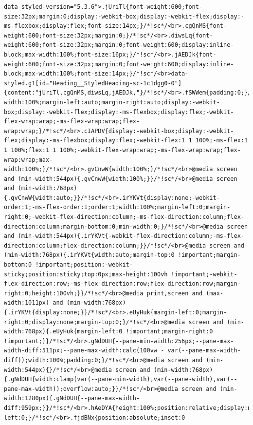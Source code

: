 \documentclass[
  letterpaper,
]{book}
\begin{document}
\begin{verbatim}
data-styled-version="5.3.6">.jUriTl{font-weight:600;font-size:32px;margin:0;display:-webkit-box;display:-webkit-flex;display:-ms-flexbox;display:flex;font-size:14px;}/*!sc*/<br>.cgQnMS{font-weight:600;font-size:32px;margin:0;}/*!sc*/<br>.diwsLq{font-weight:600;font-size:32px;margin:0;font-weight:600;display:inline-block;max-width:100%;font-size:16px;}/*!sc*/<br>.jAEDJk{font-weight:600;font-size:32px;margin:0;font-weight:600;display:inline-block;max-width:100%;font-size:14px;}/*!sc*/<br>data-styled.g1[id="Heading__StyledHeading-sc-1c1dgg0-0"]{content:"jUriTl,cgQnMS,diwsLq,jAEDJk,"}/*!sc*/<br>.fSWWem{padding:0;}/*!sc*/<br>.kPPmzM{max-width:100%;margin-left:auto;margin-right:auto;display:-webkit-box;display:-webkit-flex;display:-ms-flexbox;display:flex;-webkit-flex-wrap:wrap;-ms-flex-wrap:wrap;flex-wrap:wrap;}/*!sc*/<br>.cIAPDV{display:-webkit-box;display:-webkit-flex;display:-ms-flexbox;display:flex;-webkit-flex:1 1 100%;-ms-flex:1 1 100%;flex:1 1 100%;-webkit-flex-wrap:wrap;-ms-flex-wrap:wrap;flex-wrap:wrap;max-width:100%;}/*!sc*/<br>.gvCnwW{width:100%;}/*!sc*/<br>@media screen and (min-width:544px){.gvCnwW{width:100%;}}/*!sc*/<br>@media screen and (min-width:768px){.gvCnwW{width:auto;}}/*!sc*/<br>.irYKVt{display:none;-webkit-order:1;-ms-flex-order:1;order:1;width:100%;margin-left:0;margin-right:0;-webkit-flex-direction:column;-ms-flex-direction:column;flex-direction:column;margin-bottom:0;min-width:0;}/*!sc*/<br>@media screen and (min-width:544px){.irYKVt{-webkit-flex-direction:column;-ms-flex-direction:column;flex-direction:column;}}/*!sc*/<br>@media screen and (min-width:768px){.irYKVt{width:auto;margin-top:0 !important;margin-bottom:0 !important;position:-webkit-sticky;position:sticky;top:0px;max-height:100vh !important;-webkit-flex-direction:row;-ms-flex-direction:row;flex-direction:row;margin-right:0;height:100vh;}}/*!sc*/<br>@media print,screen and (max-width:1011px) and (min-width:768px){.irYKVt{display:none;}}/*!sc*/<br>.eUyHuk{margin-left:0;margin-right:0;display:none;margin-top:0;}/*!sc*/<br>@media screen and (min-width:768px){.eUyHuk{margin-left:0 !important;margin-right:0 !important;}}/*!sc*/<br>.gNdDUH{--pane-min-width:256px;--pane-max-width-diff:511px;--pane-max-width:calc(100vw - var(--pane-max-width-diff));width:100%;padding:0;}/*!sc*/<br>@media screen and (min-width:544px){}/*!sc*/<br>@media screen and (min-width:768px){.gNdDUH{width:clamp(var(--pane-min-width),var(--pane-width),var(--pane-max-width));overflow:auto;}}/*!sc*/<br>@media screen and (min-width:1280px){.gNdDUH{--pane-max-width-diff:959px;}}/*!sc*/<br>.hAeDYA{height:100%;position:relative;display:none;margin-left:0;}/*!sc*/<br>.fjdBNx{position:absolute;inset:0 
\end{verbatim}
\end{document}
